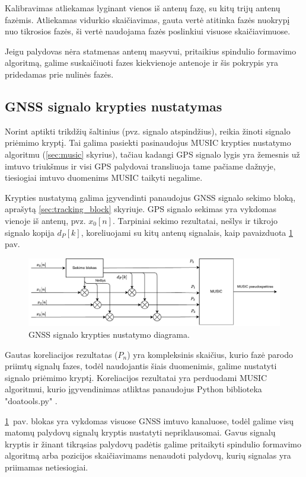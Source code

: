 \documentclass[main.tex]{subfiles}
\begin{document}
Kalibravimas atliekamas lyginant vienos iš antenų fazę, su kitų trijų antenų fazėmis.
Atliekamas vidurkio skaičiavimas, gauta vertė atitinka fazės nuokrypį nuo tikrosios
fazės, ši vertė naudojama fazės poslinkiui visuose skaičiavimuose.

Jeigu palydovas nėra statmenas antenų masyvui, pritaikius spindulio formavimo
algoritmą, galime suskaičiuoti fazes kiekvienoje antenoje ir šis pokrypis
yra pridedamas prie nulinės fazės.

\subsection{GNSS signalo krypties nustatymas}\label{sec:gnss_doa_block}

Norint aptikti trikdžių šaltinius (pvz. signalo atspindžius), reikia žinoti
signalo priėmimo kryptį. Tai galima pasiekti pasinaudojus MUSIC krypties nustatymo
algoritmu (\ref{sec:music} skyrius), tačiau kadangi GPS signalo lygis yra
žemesnis už imtuvo triukšmus
ir visi GPS palydovai transliuoja tame pačiame dažnyje,
tiesiogiai imtuvo duomenims MUSIC taikyti negalime.

Krypties nustatymą galima įgyvendinti panaudojus GNSS signalo sekimo bloką,
aprašytą \ref{sec:tracking_block} skyriuje. GPS signalo sekimas yra vykdomas
vienoje iš antenų, pvz. $x_0[n]$. Tarpiniai sekimo rezultatai, nešlys ir
tikrojo signalo kopija $d_P[k]$, koreliuojami su
kitų antenų signalais, kaip pavaizduota \ref{fig:gnss_sdr_tracking_block_doa}
pav.

\begin{figure}[h]
    \begin{centering}
    \includegraphics[scale=0.85]{drawings/tracking_diagram_doa}
    \par\end{centering}
    \protect\caption{\label{fig:gnss_sdr_tracking_block_doa}GNSS signalo krypties nustatymo diagrama.}
\end{figure}

Gautas koreliacijos rezultatas ($P_n$) yra kompleksinis skaičius, kurio
fazė parodo priimtų signalų fazes, todėl naudojantis
šiais duomenimis, galime nustatyti signalo priėmimo kryptį.
Koreliacijos rezultatai yra perduodami MUSIC algoritmui, kurio
įgyvendinimas atliktas panaudojus Python biblioteka "doatools.py" \cite{7738579}.

\ref{fig:gnss_sdr_tracking_block_doa}~pav. blokas yra vykdomas visuose
GNSS imtuvo kanaluose, todėl galime visų matomų palydovų signalų kryptis
nustatyti nepriklausomai. Gavus signalų kryptis ir žinant tikrąsias
palydovų padėtis galime pritaikyti spindulio formavimo algoritmą
arba pozicijos skaičiavimams nenaudoti palydovų, kurių signalas
yra priimamas netiesiogiai.
\end{document}
